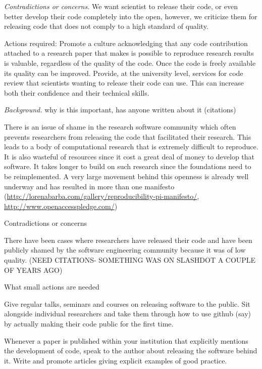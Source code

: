 \documentclass[a4paper,UKenglish]{dagman}
\begin{document}
\emph{Contradictions or concerns.} We want scientist to release their code, or even better develop their code completely into the open, however, we criticize them for releasing code that does not comply to a high standard of quality. 

Actions required: 
Promote a culture acknowledging that any code contribution attached to a research paper that makes is possible to reproduce research results is valuable, regardless of the quality of the code. Once the code is freely available its quality can be improved.
Provide, at the university level, services for code review that scientists wanting to release their code can use. This can increase both their confidence and their technical skills. 



\emph{Background.} why is this important, has anyone written about it (citations)

There is an issue of shame in the research software community which often prevents researchers from releasing the code that facilitated their research. This leads to a body of computational research that is extremely difficult to reproduce. It is also wasteful of resources since it cost a great deal of money to develop that software. It takes longer to build on such research since the foundations need to be reimplemented. A very large movement behind this openness is already well underway and has resulted in more than one manifesto (\url{http://lorenabarba.com/gallery/reproducibility-pi-manifesto/}, \url{http://www.openaccesspledge.com/})

Contradictions or concerns

There have been cases where researchers have released their code and have been publicly shamed by the software engineering community because it was of low quality. (NEED CITATIONS- SOMETHING WAS ON SLASHDOT A COUPLE OF YEARS AGO)

What small actions are needed

Give regular talks, seminars and courses on releasing software to the public. 
Sit alongside individual researchers and take them through how to use github (say) by actually making their code public for the first time.

Whenever a paper is published within your institution that explicitly mentions the development of code, speak to the author about releasing the software behind it. Write and promote articles giving explicit examples of good practice.
\end{document}
